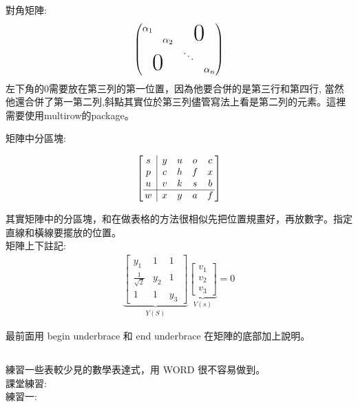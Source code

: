 對角矩陣:
\begin{equation}
\begin{pmatrix}
\alpha_1                                    &           &\multicolumn{2}{c}{\multirow{2}*{{\Huge0}}}\\
                                            &\alpha_2\\
\multicolumn{2}{c}{\multirow{2}*{{\Huge0}}}             &\ddots\\
                                            &           &       &\alpha_n
\end{pmatrix}
\end{equation}
左下角的0需要放在第三列的第一位置，因為他要合併的是第三行和第四行, 當然他還合併了第一第二列,斜點其實位於第三列儘管寫法上看是第二列的元素。這裡需要使用multirow的package。

矩陣中分區塊:

 $$\left[ \begin{array}{@{\,}c|c c c c@{\,}}
 
   s & y & u & o &c\\
   p & c & h & f & x\\
   u & v & k & s & b    \\\hline
   w & x & y &a & f \\
\end{array}\right]$$ 

其實矩陣中的分區塊，和在做表格的方法很相似先把位置規畫好，再放數字。指定直線和橫線要擺放的位置。\\
矩陣上下註記:
\begin{gather}
\underbrace{\begin{bmatrix}
y_{1}&1&1\\[4pt]
\frac{1}{\sqrt{2}} & y_{2} & 1 \\[4pt]
1 & 1 & y_{3}
\end{bmatrix}}_{Y(S)}
\underbrace{\begin{bmatrix}
v_{1} \\[4pt] v_{2} \\[4pt] v_{3}
\end{bmatrix}}_{V(s)}=0
\end{gather}

最前面用 begin underbrace 和 end underbrace 在矩陣的底部加上說明。
\subsection{}

練習一些表較少見的數學表達式，用 WORD 很不容易做到。\\
課堂練習:\\
練習一: 

